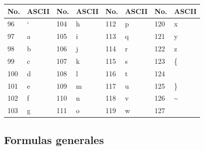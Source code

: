 \documentclass[10pt,landscape,twocolumn,letterpaper,twosided]{article}
\begin{document}
			\begin{tabular}{|l|l|l|l|l|l|l|l|}
				\hline \textbf{No.} & \textbf{ASCII} & \textbf{No.} & \textbf{ASCII}  &
					\textbf{No.} & \textbf{ASCII} & \textbf{No.} & \textbf{ASCII} \\ \hline
				96 & ` & 104 & h & 112 & p & 120 & x \\ \hline
				97 & a & 105 & i & 113 & q & 121 & y \\ \hline
				98 & b & 106 & j & 114 & r & 122 & z \\ \hline
				99 & c & 107 & k & 115 & s & 123 & \{ \\ \hline
				100 & d & 108 & l & 116 & t & 124 & \textbar \\ \hline
				101 & e & 109 & m & 117 & u & 125 & \} \\ \hline
				102 & f & 110 & n & 118 & v & 126 & \textasciitilde \\ \hline
				103 & g &  111 & o & 119 & w & 127 &  \\ \hline
			\end{tabular}
		


\subsection{Formulas generales}

\end{document}
